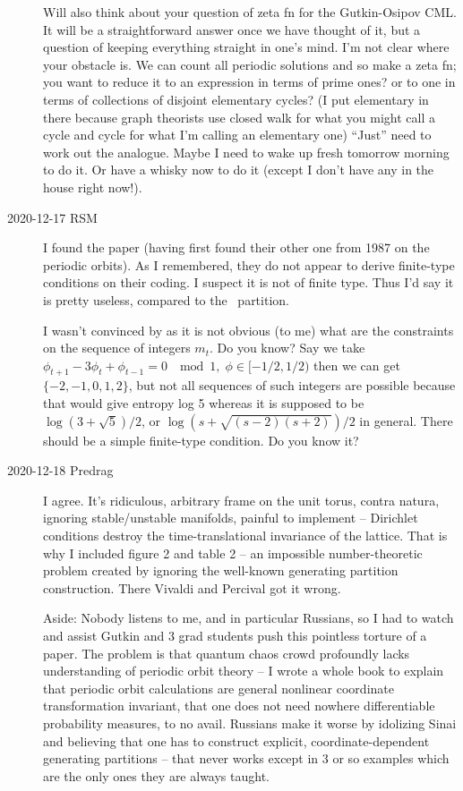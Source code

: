 \begin{description}
Will also think about your question of zeta fn for the Gutkin-Osipov CML.
It will be a straightforward answer once we have thought of it, but a
question of keeping everything straight in one's mind.  I'm not clear
where your obstacle is.  We can count all {\spt} periodic solutions and
so make a zeta fn; you want to reduce it to an expression in terms of
prime ones? or to one in terms of collections of disjoint elementary
cycles? (I put elementary in there because graph theorists use closed
walk for what you might call a cycle and cycle for what I'm calling an
elementary one)  ``Just'' need to work out the {\spt} analogue.  Maybe I
need to wake up fresh tomorrow morning to do it.  Or have a whisky now to
do it (except I don't have any in the house right now!).

\item[2020-12-17 RSM]
I found the \PV{} paper (having first found their other
one from 1987 on the periodic orbits).
As I remembered, they do not appear to derive finite-type conditions on
their coding.  I suspect it is not of finite type.  Thus I'd say it is
pretty useless, compared to the \AW\ partition.

I wasn't convinced by  \PV{} as it is not obvious (to me) what
are the constraints on the sequence of integers $m_t$.  Do you know?  Say
we take
\(
   \phi_{t+1}-3\phi_t+\phi_{t-1}=0\;\mod 1,\; \phi \in [-1/2,1/2)
\)
then we can get $\{-2,-1,0,1,2\}$, but not all sequences of such integers
are possible because that would give entropy log 5 whereas it is supposed
to be $\log(3+\sqrt{5})/2$, or
$\log(s+\sqrt{(s-2)(s+2)})/2$ in general.
There should be a simple finite-type condition. Do you know it?

\item[2020-12-18 Predrag]
I agree. It's ridiculous, arbitrary frame on the unit torus, contra
natura, ignoring stable/unstable manifolds, painful to implement –
Dirichlet conditions destroy the time-translational invariance of the
lattice. That is why I included
{figure 2} and
{table 2} – an impossible
number-theoretic problem created by ignoring the well-known generating
partition construction. There Vivaldi and Percival got it wrong.

Aside: Nobody listens to me, and in particular Russians, so I had to
watch and assist Gutkin and 3 grad students push this pointless torture
of a paper. The problem is that quantum chaos crowd profoundly lacks
understanding of periodic orbit theory – I wrote a whole book to explain
that periodic orbit calculations are general nonlinear coordinate
transformation invariant, that one does not need nowhere differentiable
probability measures, to no avail. Russians make it worse by idolizing
Sinai and believing that one has to construct explicit,
coordinate-dependent generating partitions – that never works except in 3
or so examples which are the only ones they are always taught.


\end{description}
